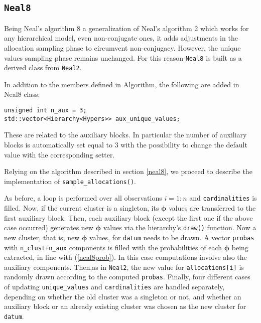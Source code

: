 \subsection{\texttt{Neal8}}

Being Neal's algorithm 8 a generalization of Neal's algorithm 2 which works for any hierarchical model, even non-conjugate ones, it adds adjustments in the allocation sampling phase to circumvent non-conjugacy.
However, the unique values sampling phase remains unchanged. For this reason \verb|Neal8| is built as a derived class from \verb|Neal2|.

In addition to the members defined in Algorithm, the following are added in Neal8 class:
\begin{verbatim}
unsigned int n_aux = 3;
std::vector<Hierarchy<Hypers>> aux_unique_values;
\end{verbatim}
These are related to the auxiliary blocks. In particular the number of auxiliary blocks is automatically set equal to 3 with the possibility to change the default value with the corresponding setter.

Relying on the algorithm described in section \ref{neal8}, we proceed to describe the implementation of \verb|sample_allocations()|.

As before, a loop is performed over all observations $i=1:n$ and \verb|cardinalities| is filled. Now, if the current cluster is a singleton, its $\boldsymbol\phi$ values are transferred to the first auxiliary block. Then, each auxiliary block (except the first one if the above case occurred) generates new $\boldsymbol\phi$ values via the hierarchy's \verb|draw()| function. Now a new cluster, that is, new $\boldsymbol\phi$ values, for \verb|datum| needs to be drawn. 	A vector \verb|probas| with \verb|n_clust+n_aux| components is filled with the probabilities of each $\boldsymbol\phi$ being extracted, in line with (\ref{neal8prob}). In this case computations involve also the auxiliary components. Then,as in \verb|Neal2|, the new value for \verb|allocations[i]| is randomly drawn according to the computed \verb|probas|. Finally, four different cases of updating \verb|unique_values| and \verb|cardinalities| are handled separately, depending on whether the old cluster was a singleton or not, and whether an auxiliary block or an already existing cluster was chosen as the new cluster for \verb|datum|.
